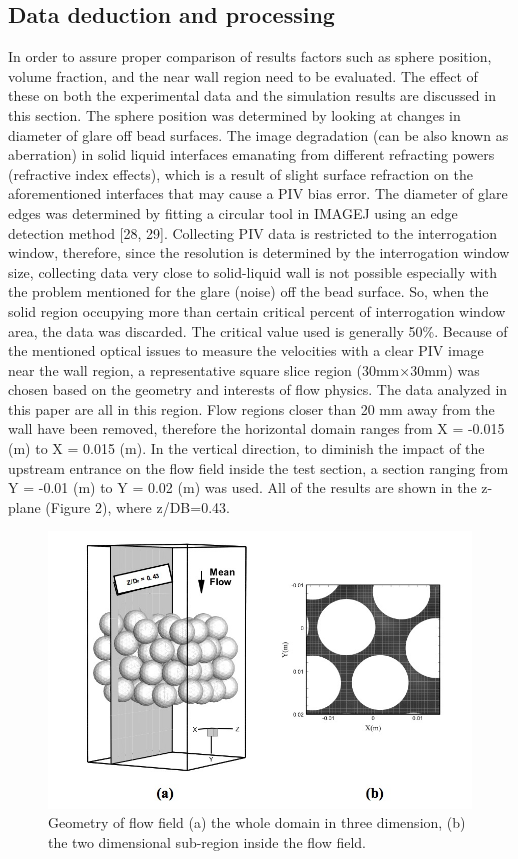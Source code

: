 \documentclass[letterpaper,12pt,titlepage,fleqn]{article}
\begin{document}
\begin{CJK}{UTF8}{gkai}
\section{Data deduction and processing}
In order to assure proper comparison of results factors such as sphere position, volume fraction, and the near wall region need to be evaluated. The effect of these on both the experimental data and the simulation results are discussed in this section. 
The sphere position was determined by looking at changes in diameter of glare off bead surfaces. The image degradation (can be also known as aberration) in solid liquid interfaces emanating from different refracting powers (refractive index effects), which is a result of slight surface refraction on the aforementioned interfaces that may cause a PIV bias error. The diameter of glare edges was determined by fitting a circular tool in IMAGEJ using an edge detection method [28, 29].
Collecting PIV data is restricted to the interrogation window, therefore, since the resolution is determined by the interrogation window size, collecting data very close to solid-liquid wall is not possible especially with the problem mentioned for the glare (noise) off the bead surface. So, when the solid region occupying more than certain critical percent of interrogation window area, the data was discarded. The critical value used is generally 50\%. Because of the mentioned optical issues to measure the velocities with a clear PIV image near the wall region, a representative square slice region (30mm×30mm) was chosen based on the geometry and interests of flow physics. The data analyzed in this paper are all in this region. Flow regions closer than 20 mm away from the wall have been removed, therefore the horizontal domain ranges from X = -0.015 (m) to X = 0.015 (m). In the vertical direction, to diminish the impact of the upstream entrance on the flow field inside the test section, a section ranging from Y = -0.01 (m) to Y = 0.02 (m) was used. All of the results are shown in the z-plane (Figure 2), where z/DB=0.43.

\begin{figure}[!h]
	\centering
	\includegraphics[width= 0.5\linewidth ]{pic2.jpg}
	\caption{Geometry of flow field (a) the whole domain in three dimension, (b) the two dimensional sub-region inside the flow field.}
\end{figure}


\end{CJK}
\end{document}
